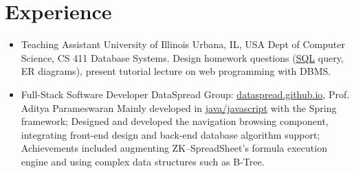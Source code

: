 \documentclass[11pt,a4paper,sans]{moderncv}        %
\begin{document}
\section{Experience}
\begin{itemize}
	
	\item{
	      {Teaching Assistant}
	      {University of Illinois}
	      {Urbana, IL, USA}
	      {Dept of Computer Science, CS 411 Database Systems.}
	      {Design homework questions (\underline{SQL} query, ER diagrams), present tutorial lecture on web programming with DBMS.}
	      }
	      
	\item{
	      {Full-Stack Software Developer}
	      {\vspace{-10pt}}
	      {}
	      {DataSpread Group:
		      \href{https://dataspread.github.io}{\underline{dataspread.github.io}}, Prof. Aditya Parameswaran}
	      {
		      Mainly developed in \underline{java/javascript} with the Spring framework;
		      Designed and developed the navigation browsing component, integrating front-end design and back-end database algorithm support;
		      Achievements included augmenting ZK--SpreadSheet's formula execution engine and using complex data structures such as B-Tree.}
	      }
	      
	      

\end{itemize}
\end{document}
